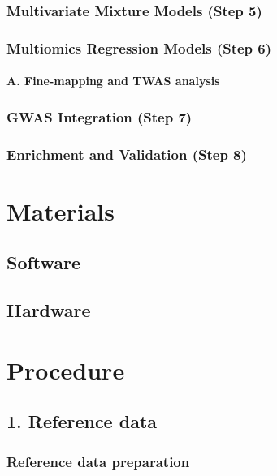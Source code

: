 \documentclass[12pt]{article}
\begin{document}
\subsubsection*{Multivariate Mixture Models (Step 5)}

\subsubsection*{Multiomics Regression Models (Step 6)}

\paragraph*{A.  Fine-mapping and TWAS analysis}


\subsubsection*{GWAS Integration (Step 7)}

\subsubsection*{Enrichment and Validation (Step 8)}


\section*{Materials}




\subsection*{Software}




\subsection*{Hardware}




\section*{Procedure}





\subsection*{1. Reference data}


\subsubsection*{Reference data preparation}
\end{document}
